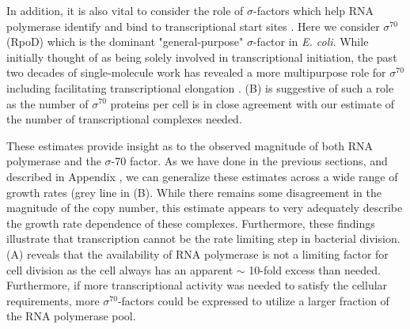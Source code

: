 In addition, it is also vital to consider the role of $\sigma$-factors which
help RNA polymerase identify and bind to transcriptional start sites
\citep{browning2016}. Here we consider $\sigma^{70}$ (RpoD) which is the
dominant "general-purpose" $\sigma$-factor in \textit{E. coli}. While initially
thought of as being solely involved in transcriptional initiation, the past two
decades of single-molecule work has revealed a more multipurpose role for
$\sigma^{70}$ including facilitating transcriptional elongation
\citep{kapanidis2005, goldman2015, perdue2011,mooney2003,mooney2005}.
 (B) is suggestive of such a role as the number of
$\sigma^{70}$ proteins per cell is in close agreement with our estimate of the
number of transcriptional complexes needed.

These estimates provide insight as to the observed magnitude of both RNA
polymerase and the $\sigma$-70 factor. As we have done in the previous sections,
and described in Appendix , we can generalize these estimates
across a wide range of growth rates (grey line in (B). While
there remains some disagreement in the magnitude of the copy number, this
estimate appears to very adequately describe the growth rate dependence of these
complexes. Furthermore, these findings illustrate that transcription
cannot be the rate limiting step in bacterial division.  (A)
reveals that the availability of RNA polymerase is not a limiting factor for
cell division as the cell always has an apparent $\sim$ 10-fold excess than needed.
Furthermore, if more transcriptional activity was needed to satisfy the cellular
requirements, more $\sigma^{70}$-factors could be expressed to utilize a larger
fraction of the RNA polymerase pool.

